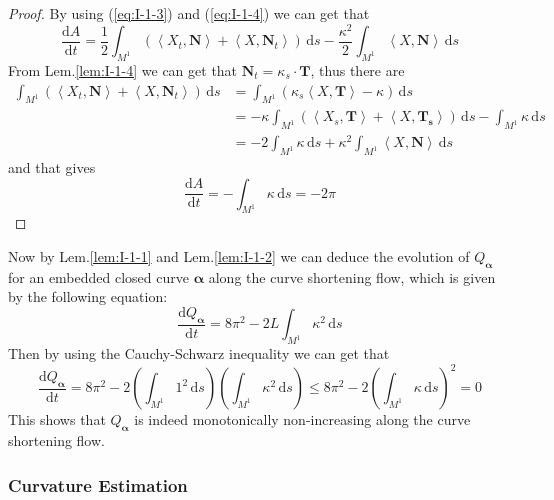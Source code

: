 \begin{proof}
    By using (\ref{eq:I-1-3}) and (\ref{eq:I-1-4}) we can get that
    \begin{equation*}
        \frac{\mathrm{d}A}{\mathrm{d}t}=\frac{1}{2}\int_{M^1}\left(\left<X_t,\mathbf{N}\right>+\left<X,\mathbf{N}_t\right>\right)\,\mathrm{d}s-\frac{\kappa^2}{2}\int_{M^1}\left<X,\mathbf{N}\right>\,\mathrm{d}s
    \end{equation*}
    From Lem.\ref{lem:I-1-4} we can get that $\mathbf{N}_t=\kappa_s\cdot\mathbf{T}$, thus there are
    \begin{align*}
        \int_{M^1}\left(\left<X_t,\mathbf{N}\right>+\left<X,\mathbf{N}_t\right>\right)\,\mathrm{d}s&=\int_{M^1}\left(\kappa_s\left<X,\mathbf{T}\right>-\kappa\right)\,\mathrm{d}s\\
        &=-\kappa\int_{M^1}\left(\left<X_s,\mathbf{T}\right>+\left<X,\mathbf{T_s}\right>\right)\,\mathrm{d}s-\int_{M^1}\kappa\,\mathrm{d}s\\
        &=-2\int_{M^1}\kappa\,\mathrm{d}s+\kappa^2\int_{M^1}\left<X,\mathbf{N}\right>\,\mathrm{d}s
    \end{align*}
    and that gives
    \begin{equation*}
        \frac{\mathrm{d}A}{\mathrm{d}t}=-\int_{M^1}\kappa\,\mathrm{d}s=-2\pi
    \end{equation*}
\end{proof}

Now by Lem.\ref{lem:I-1-1} and Lem.\ref{lem:I-1-2} we can deduce the evolution of $Q_{\boldsymbol{\alpha}}$ for an embedded closed curve $\boldsymbol{\alpha}$ along the curve shortening flow, which is given by the following equation:
\begin{equation*}
    \frac{\mathrm{d}Q_{\boldsymbol{\alpha}}}{\mathrm{d}t}=8\pi^2-2L\int_{M^1}\kappa^2\,\mathrm{d}s
\end{equation*}
Then by using the Cauchy-Schwarz inequality we can get that
\begin{equation*}
    \frac{\mathrm{d}Q_{\boldsymbol{\alpha}}}{\mathrm{d}t}=8\pi^2-2\left(\int_{M^1}1^2\,\mathrm{d}s\right)\left(\int_{M^1}\kappa^2\,\mathrm{d}s\right)\le 8\pi^2-2{\left(\int_{M^1}\kappa\,\mathrm{d}s\right)}^2=0
\end{equation*}
This shows that $Q_{\boldsymbol{\alpha}}$ is indeed monotonically non-increasing along the curve shortening flow.

\subsubsection{Curvature Estimation}

